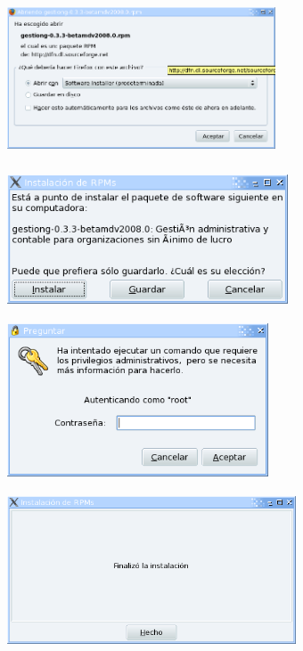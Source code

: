 \begin{center}
\includegraphics[width=7.964cm,height=4.643cm]{manual-img2.png}
\end{center}
\begin{center}
\includegraphics[width=8.345cm,height=3.928cm]{manual-img3.png}
\end{center}
\begin{center}
\includegraphics[width=7.758cm,height=4.648cm]{manual-img4.png}
\end{center}
\begin{center}
\includegraphics[width=8.56cm,height=4.489cm]{manual-img5.png}
\end{center}

\bigskip


